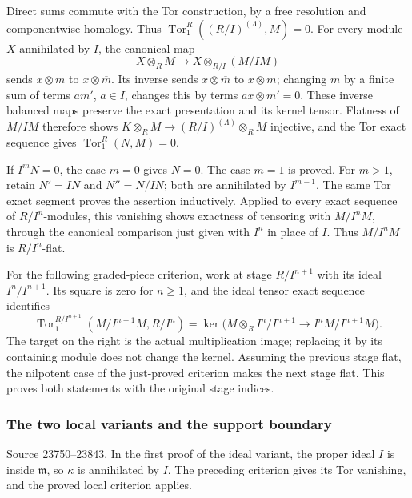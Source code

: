 Direct sums commute with the Tor construction, by a free resolution and componentwise homology. Thus \(\operatorname{Tor}_1^R((R/I)^{(\Lambda)},M)=0\). For every module \(X\) annihilated by \(I\), the canonical map \[
X\otimes_R M\longrightarrow X\otimes_{R/I}(M/IM)
\] sends \(x\otimes m\) to \(x\otimes\overline m\). Its inverse sends \(x\otimes\overline m\) to \(x\otimes m\); changing \(m\) by a finite sum of terms \(am'\), \(a\in I\), changes this by terms \(ax\otimes m'=0\). These inverse balanced maps preserve the exact presentation and its kernel tensor. Flatness of \(M/IM\) therefore shows \(K\otimes_RM\to(R/I)^{(\Lambda)}\otimes_RM\) injective, and the Tor exact sequence gives \(\operatorname{Tor}_1^R(N,M)=0\).

If \(I^mN=0\), the case \(m=0\) gives \(N=0\). The case \(m=1\) is proved. For \(m>1\), retain \(N'=IN\) and \(N''=N/IN\); both are annihilated by \(I^{m-1}\). The same Tor exact segment proves the assertion inductively. Applied to every exact sequence of \(R/I^n\)-modules, this vanishing shows exactness of tensoring with \(M/I^nM\), through the canonical comparison just given with \(I^n\) in place of \(I\). Thus \(M/I^nM\) is \(R/I^n\)-flat.

For the following graded-piece criterion, work at stage \(R/I^{n+1}\) with its ideal \(I^n/I^{n+1}\). Its square is zero for \(n\geq1\), and the ideal tensor exact sequence identifies \[
\operatorname{Tor}_1^{R/I^{n+1}}(M/I^{n+1}M,R/I^n)
 =\ker\bigl(M\otimes_R I^n/I^{n+1}\to I^nM/I^{n+1}M\bigr).
\] The target on the right is the actual multiplication image; replacing it by its containing module does not change the kernel. Assuming the previous stage flat, the nilpotent case of the just-proved criterion makes the next stage flat. This proves both statements with the original stage indices.

\subsubsection{The two local variants and the support boundary}\label{algebra-proof-016-the-two-local-variants-and-the-support-boundary}

Source 23750--23843. In the first proof of the ideal variant, the proper ideal \(I\) is inside \(\mathfrak m\), so \(\kappa\) is annihilated by \(I\). The preceding criterion gives its Tor vanishing, and the proved local criterion applies.

